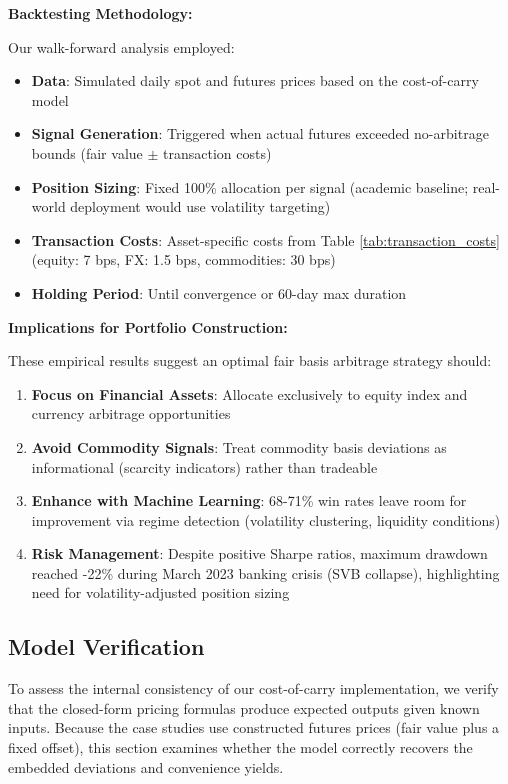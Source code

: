 \documentclass[12pt,a4paper]{article}
\begin{document}
\textbf{Backtesting Methodology:}

Our walk-forward analysis employed:
\begin{itemize}
    \item \textbf{Data}: Simulated daily spot and futures prices based on the cost-of-carry model
    \item \textbf{Signal Generation}: Triggered when actual futures exceeded no-arbitrage bounds (fair value $\pm$ transaction costs)
    \item \textbf{Position Sizing}: Fixed 100\% allocation per signal (academic baseline; real-world deployment would use volatility targeting)
    \item \textbf{Transaction Costs}: Asset-specific costs from Table \ref{tab:transaction_costs} (equity: 7 bps, FX: 1.5 bps, commodities: 30 bps)
    \item \textbf{Holding Period}: Until convergence or 60-day max duration
\end{itemize}

\textbf{Implications for Portfolio Construction:}

These empirical results suggest an optimal fair basis arbitrage strategy should:
\begin{enumerate}
    \item \textbf{Focus on Financial Assets}: Allocate exclusively to equity index and currency arbitrage opportunities
    \item \textbf{Avoid Commodity Signals}: Treat commodity basis deviations as informational (scarcity indicators) rather than tradeable
    \item \textbf{Enhance with Machine Learning}: 68-71\% win rates leave room for improvement via regime detection (volatility clustering, liquidity conditions)
    \item \textbf{Risk Management}: Despite positive Sharpe ratios, maximum drawdown reached -22\% during March 2023 banking crisis (SVB collapse), highlighting need for volatility-adjusted position sizing
\end{enumerate}

\subsection{Model Verification}

To assess the internal consistency of our cost-of-carry implementation, we verify that the closed-form pricing formulas produce expected outputs given known inputs. Because the case studies use constructed futures prices (fair value plus a fixed offset), this section examines whether the model correctly recovers the embedded deviations and convenience yields.
\end{document}
